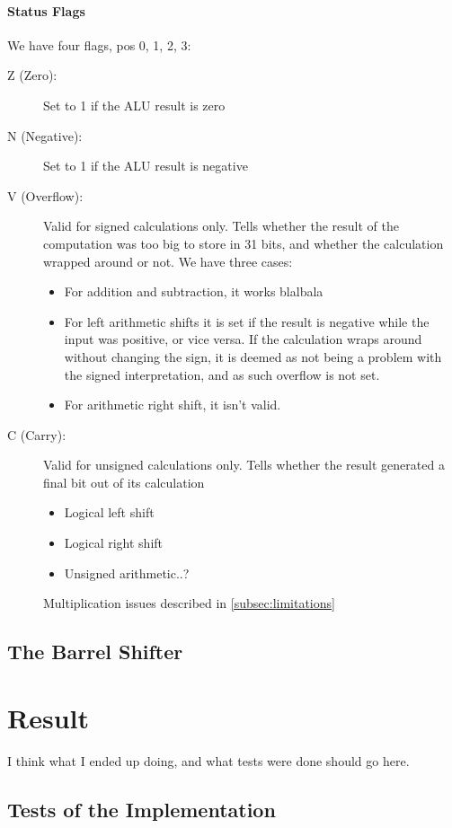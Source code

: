 \documentclass{article}
\begin{document}
\paragraph{Status Flags}
\label{flags}
We have four flags, pos 0, 1, 2, 3:
\begin{description}
\item[Z (Zero):] Set to 1 if the ALU result is zero
\item[N (Negative):] Set to 1 if the ALU result is negative
\item[V (Overflow):] Valid for signed calculations only. Tells whether the result of the computation was too big to store in 31 bits, and whether the calculation wrapped around or not. We have three cases:
\begin{itemize}
\item For addition and subtraction, it works blalbala
\item For left arithmetic shifts it is set if the result is negative while the input was positive, or vice versa. If the calculation wraps around without changing the sign, it is deemed as not being a problem with the signed interpretation, and as such overflow is not set.
\item  For arithmetic right shift, it isn't valid.
\end{itemize}
\item[C (Carry):] Valid for unsigned calculations only. Tells whether the result generated a final bit out of its calculation
\begin{itemize}
\item Logical left shift
\item Logical right shift
\item Unsigned arithmetic..?
\end{itemize}

Multiplication issues described in \ref{subsec:limitations}
\end{description}



\subsection{The Barrel Shifter}
\label{subsubsec:barrelshifter}


\section{Result}
\label{sec:result}
I think what I ended up doing, and what tests were done should go here.
\subsection{Tests of the Implementation}
\label{sec:tests}
\end{document}
